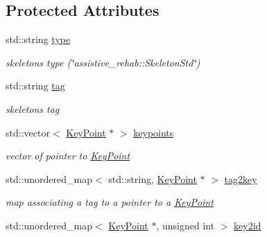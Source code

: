 \subsection*{Protected Attributes}
\begin{DoxyCompactItemize}
\item 
\mbox{\label{classassistive__rehab_1_1Skeleton_a679b826030f01f307d938e583f27d23b}} 
std\+::string \hyperlink{classassistive__rehab_1_1Skeleton_a679b826030f01f307d938e583f27d23b}{type}
\begin{DoxyCompactList}\small\item\em skeleton\textquotesingle{}s type (\char`\"{}assistive\+\_\+rehab\+::\+Skeleton\+Std\char`\"{}) \end{DoxyCompactList}\item 
\mbox{\label{classassistive__rehab_1_1Skeleton_a3d1ce5280300e012826948dc4383c2cb}} 
std\+::string \hyperlink{classassistive__rehab_1_1Skeleton_a3d1ce5280300e012826948dc4383c2cb}{tag}
\begin{DoxyCompactList}\small\item\em skeleton\textquotesingle{}s tag \end{DoxyCompactList}\item 
\mbox{\label{classassistive__rehab_1_1Skeleton_a5f61fbdd10430985cd6754e182226787}} 
std\+::vector$<$ \hyperlink{classassistive__rehab_1_1KeyPoint}{Key\+Point} $\ast$ $>$ \hyperlink{classassistive__rehab_1_1Skeleton_a5f61fbdd10430985cd6754e182226787}{keypoints}
\begin{DoxyCompactList}\small\item\em vector of pointer to \hyperlink{classassistive__rehab_1_1KeyPoint}{Key\+Point} \end{DoxyCompactList}\item 
\mbox{\label{classassistive__rehab_1_1Skeleton_ada4d4b327f1f71520e62e42db9d4c656}} 
std\+::unordered\+\_\+map$<$ std\+::string, \hyperlink{classassistive__rehab_1_1KeyPoint}{Key\+Point} $\ast$ $>$ \hyperlink{classassistive__rehab_1_1Skeleton_ada4d4b327f1f71520e62e42db9d4c656}{tag2key}
\begin{DoxyCompactList}\small\item\em map associating a tag to a pointer to a \hyperlink{classassistive__rehab_1_1KeyPoint}{Key\+Point} \end{DoxyCompactList}\item 
\mbox{\label{classassistive__rehab_1_1Skeleton_a4b1c3607cabb58053e4c367015e98e28}} 
std\+::unordered\+\_\+map$<$ \hyperlink{classassistive__rehab_1_1KeyPoint}{Key\+Point} $\ast$, unsigned int $>$ \hyperlink{classassistive__rehab_1_1Skeleton_a4b1c3607cabb58053e4c367015e98e28}{key2id}

\end{DoxyCompactItemize}
